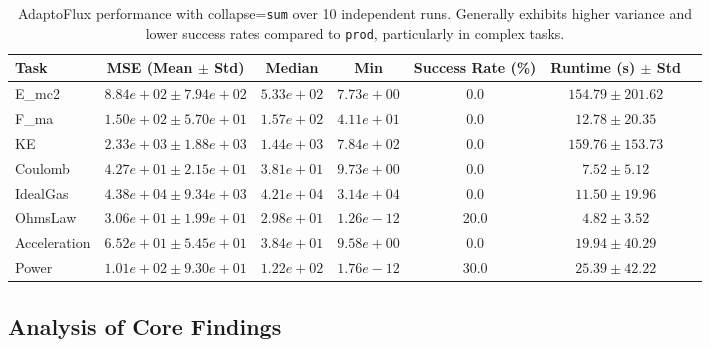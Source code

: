 \begin{table}[htbp]
    \centering
    \small %
    \setlength{\tabcolsep}{3pt} %
    \caption{AdaptoFlux performance with collapse=\texttt{sum} over 10 independent runs. Generally exhibits higher variance and lower success rates compared to \texttt{prod}, particularly in complex tasks.}
    \label{tab:atf_stats_sum}
    \begin{tabular}{lcccccc}
        \toprule
        Task & MSE (Mean $\pm$ Std) & Median & Min & Success Rate (\%) & Runtime (s) $\pm$ Std \\
        \midrule
        E\_mc2       & $8.84e+02 \pm 7.94e+02$ & $5.33e+02$ & $7.73e+00$ & 0.0  & $154.79 \pm 201.62$ \\
        F\_ma        & $1.50e+02 \pm 5.70e+01$ & $1.57e+02$ & $4.11e+01$ & 0.0  & $12.78 \pm 20.35$ \\
        KE           & $2.33e+03 \pm 1.88e+03$ & $1.44e+03$ & $7.84e+02$ & 0.0  & $159.76 \pm 153.73$ \\
        Coulomb      & $4.27e+01 \pm 2.15e+01$ & $3.81e+01$ & $9.73e+00$ & 0.0  & $7.52 \pm 5.12$ \\
        IdealGas     & $4.38e+04 \pm 9.34e+03$ & $4.21e+04$ & $3.14e+04$ & 0.0  & $11.50 \pm 19.96$ \\
        OhmsLaw      & $3.06e+01 \pm 1.99e+01$ & $2.98e+01$ & $1.26e-12$ & 20.0 & $4.82 \pm 3.52$ \\
        Acceleration & $6.52e+01 \pm 5.45e+01$ & $3.84e+01$ & $9.58e+00$ & 0.0  & $19.94 \pm 40.29$ \\
        Power        & $1.01e+02 \pm 9.30e+01$ & $1.22e+02$ & $1.76e-12$ & 30.0 & $25.39 \pm 42.22$ \\
        \bottomrule
    \end{tabular}
\end{table}

\subsection{Analysis of Core Findings}

